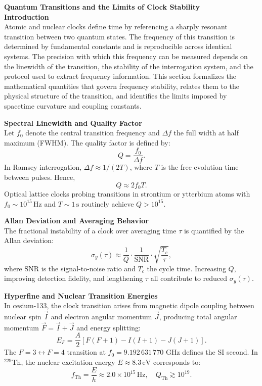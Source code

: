 \begin{technical}
{\Large\textbf{Quantum Transitions and the Limits of Clock Stability}}\\[0.3em]
\textbf{Introduction}\\[0.5em]
Atomic and nuclear clocks define time by referencing a sharply resonant transition between two quantum states. The frequency of this transition is determined by fundamental constants and is reproducible across identical systems. The precision with which this frequency can be measured depends on the linewidth of the transition, the stability of the interrogation system, and the protocol used to extract frequency information. This section formalizes the mathematical quantities that govern frequency stability, relates them to the physical structure of the transition, and identifies the limits imposed by spacetime curvature and coupling constants.

\textbf{Spectral Linewidth and Quality Factor}\\[0.5em]
Let $f_0$ denote the central transition frequency and $\Delta f$ the full width at half maximum (FWHM). The quality factor is defined by:
\[
Q = \frac{f_0}{\Delta f}.
\]
In Ramsey interrogation, $\Delta f \approx 1/(2T)$, where $T$ is the free evolution time between pulses. Hence,
\[
Q \approx 2 f_0 T.
\]
Optical lattice clocks probing transitions in strontium or ytterbium atoms with $f_0 \sim 10^{15}\,\mathrm{Hz}$ and $T \sim 1\,\mathrm{s}$ routinely achieve $Q > 10^{15}$.

\textbf{Allan Deviation and Averaging Behavior}\\[0.5em]
The fractional instability of a clock over averaging time $\tau$ is quantified by the Allan deviation:
\[
\sigma_y(\tau) \approx \frac{1}{Q} \cdot \frac{1}{\mathrm{SNR}} \cdot \sqrt{\frac{T_c}{\tau}},
\]
where $\mathrm{SNR}$ is the signal-to-noise ratio and $T_c$ the cycle time. Increasing $Q$, improving detection fidelity, and lengthening $\tau$ all contribute to reduced $\sigma_y(\tau)$.

\textbf{Hyperfine and Nuclear Transition Energies}\\[0.5em]
In cesium-133, the clock transition arises from magnetic dipole coupling between nuclear spin $\vec{I}$ and electron angular momentum $\vec{J}$, producing total angular momentum $\vec{F} = \vec{I} + \vec{J}$ and energy splitting:
\[
E_F = \frac{A}{2} \left[ F(F+1) - I(I+1) - J(J+1) \right].
\]
The $F=3 \leftrightarrow F=4$ transition at $f_0 = 9.192\,631\,770$ GHz defines the SI second. In $^{229}$Th, the nuclear excitation energy $E \approx 8.3\,\mathrm{eV}$ corresponds to:
\[
f_{\mathrm{Th}} = \frac{E}{h} \approx 2.0 \times 10^{15}\,\mathrm{Hz}, \quad Q_{\mathrm{Th}} \gtrsim 10^{19}.
\]


\end{technical}
